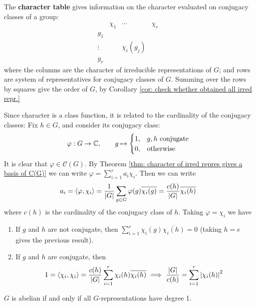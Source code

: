 \begin{notation}
    The \textbf{character table} gives information on the character evaluated on conjugacy classes of a group:
    \[
        \begin{array}{c|ccc}
            & \chi_1 & \cdots & \chi_r \\
            \hline
            g_1 & & & \\
            \vdots & & \chi_i(g_j) & \\
            g_r & & &
        \end{array}
    \]
    where the columns are the character of irreducible representations of $G$; and rows are system of representatives for conjugacy classes of $G$. Summing over the rows by squares give the order of $G$, by Corollary \ref{cor: check whether obtained all irred repr.}
\end{notation}

Since character is a class function, it is related to the cardinality of the conjugacy classes: Fix $h \in G$, and consider its conjugacy class:
\[
    \varphi: G \to \mathbb{C}, \qquad g \mapsto 
    \begin{cases}
        1, & g, h \text{ conjugate} \\
        0, & \text{otherwise}
    \end{cases}
\]
It is clear that $\varphi \in \mathcal{C}(G)$. By Theorem \ref{thm: character of irred repres gives a basis of C(G)} we can write $\varphi = \sum_{i = 1}^r a_i \chi_i$. Then we can write
\[
    a_i = \left\langle \varphi, \chi_i \right\rangle = \frac{1}{\left|G\right|} \sum_{g \in G} \varphi(g) \overline{\chi_i(g)} = \frac{c(h)}{\left|G\right|} \overline{\chi_i(h)}
\]
where $c(h)$ is the cardinality of the conjugacy class of $h$. Taking $\varphi = \chi_i$ we have
\begin{enumerate}[label=\arabic*)]
    \item If $g$ and $h$ are not conjugate, then $\sum_{i = 1}^r \chi_i(g) \overline{\chi_i(h)} = 0$ (taking $h = e$ gives the previous result).
    \item If $g$ and $h$ are conjugate, then
    \[
        1 = \left\langle \chi_i, \chi_i \right\rangle = \frac{c(h)}{\left|G\right|} \sum_{i = 1}^r \chi_i(h) \overline{\chi_i(h)} \ \Longrightarrow\  \frac{\left|G\right|}{c(h)} = \sum_{i = 1}^r \left|\chi_i(h)\right|^2
    \]
\end{enumerate}

\begin{proposition}
    $G$ is abelian if and only if all $G$-representations have degree 1.
\end{proposition}

